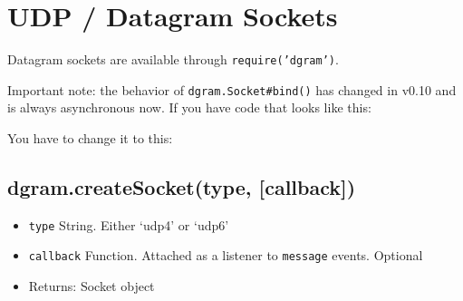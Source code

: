 \section{UDP / Datagram Sockets}\label{udp-datagram-sockets}

\begin{Shaded}
\begin{Highlighting}[]
 
\end{Highlighting}
\end{Shaded}

Datagram sockets are available through \texttt{require('dgram')}.

Important note: the behavior of \texttt{dgram.Socket\#bind()} has
changed in v0.10 and is always asynchronous now. If you have code that
looks like this:

\begin{Shaded}
\begin{Highlighting}[]
 \NormalTok{(}\NormalTok{);}
\NormalTok{(}\NormalTok{);}
\NormalTok{(}\NormalTok{);}
\end{Highlighting}
\end{Shaded}

You have to change it to this:

\begin{Shaded}
\begin{Highlighting}[]
 \NormalTok{(}\NormalTok{);}
\NormalTok{(}\NormalTok{, }\NormalTok{() \{}
  \NormalTok{(}\NormalTok{);}
\NormalTok{\});}
\end{Highlighting}
\end{Shaded}

\subsection{dgram.createSocket(type,
{[}callback{]})}\label{dgram.createsockettype-callback}

\begin{itemize}
\itemsep1pt\parskip0pt
\item
  \texttt{type} String. Either `udp4' or `udp6'
\item
  \texttt{callback} Function. Attached as a listener to \texttt{message}
  events. Optional
\item
  Returns: Socket object
\end{itemize}

